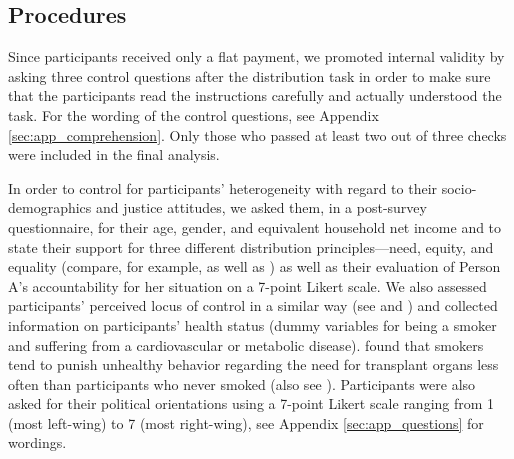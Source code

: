 \documentclass[smallcondensed]{svjour3}
\begin{document}
\subsection{Procedures}\label{sec:procedure}
%
Since participants received only a flat payment, we promoted internal validity by asking three control questions after the distribution task in order to make sure that the participants read the instructions carefully and actually understood the task. For the wording of the control questions, see Appendix \ref{sec:app_comprehension}. Only those who passed at least two out of three checks were included in the final analysis.\par
%
In order to control for participants' heterogeneity with regard to their socio-demo\-graphics and justice attitudes, we asked them, in a post-survey questionnaire, for their age, gender, and equivalent household net income and to state their support for three different distribution principles---need, equity, and equality (compare, for example, \citealt{skitka_allocating_1992} as well as \citealt{mitchell_judgments_1993}) as well as their evaluation of Person A's accountability for her situation on a 7-point Likert scale. We also assessed participants' perceived locus of control in a similar way (see \citealt{fong_social_2001} and \citealt{phares_internal-external_1975}) and collected information on participants' health status (dummy variables for being a smoker and suffering from a cardiovascular or metabolic disease). \cite{ubel_allocation_2001} found that smokers tend to punish unhealthy behavior regarding the need for transplant organs less often than participants who never smoked (also see \citealt{diederich_zur_2010}). Participants were also asked for their political orientations using a 7-point Likert scale ranging from 1 (most left-wing) to 7 (most right-wing), see Appendix \ref{sec:app_questions} for wordings.\par
%
\end{document}
